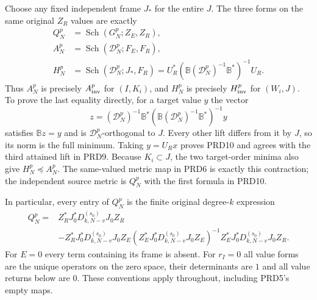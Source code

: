 \documentclass[11pt,a4paper]{article}
\begin{document}
Choose any fixed independent frame $J_*$ for the entire $J$.
The three forms on the same original $Z_R$ values are exactly
\[
\begin{aligned}
 Q_N^p&=\operatorname{Sch}(G_N^p;Z_E,Z_R),\\
 A_N^p&=\operatorname{Sch}(\mathcal D_N^p;F_E,F_R),\\
 H_N^p&=\operatorname{Sch}(\mathcal D_N^p;J_*,F_R)
      =U_R^*(\mathbb B(\mathcal D_N^p)^{-1}\mathbb B^*)^{-1}U_R.
\end{aligned}                                                    \tag{PRD10}
\]
Thus $A_N^p$ is precisely $A_{\rm inv}^p$ for $(I,K_i)$,
and $H_N^p$ is precisely $H_{\rm inv}^p$ for $(W_i,J)$.
To prove the last equality directly, for a target value $y$ the
vector
\[
 z=(\mathcal D_N^p)^{-1}\mathbb B^*
       (\mathbb B(\mathcal D_N^p)^{-1}\mathbb B^*)^{-1}y
\]
satisfies $\mathbb Bz=y$ and is $\mathcal D_N^p$-orthogonal
to $J$. Every other lift differs from it by $J$, so its norm
is the full minimum. Taking $y=U_Rx$ proves PRD10 and agrees
with the third attained lift in PRD9. Because $K_i\subset J$,
the two target-order minima also give $H_N^p\preceq A_N^p$.
The same-valued metric map in PRD6 is exactly this contraction;
the independent source metric is $Q_N^p$ with the first
formula in PRD10.

In particular, every entry of $Q_N^p$ is the finite original
degree-$k$ expression
\[
\begin{split}
 Q_N^p={}&Z_R^*J_0^*D_{k,N-v}^{(s_0)}J_0Z_R\\
 &-Z_R^*J_0^*D_{k,N-v}^{(s_0)}J_0Z_E
 (Z_E^*J_0^*D_{k,N-v}^{(s_0)}J_0Z_E)^{-1}
 Z_E^*J_0^*D_{k,N-v}^{(s_0)}J_0Z_R .
\end{split}                                                      \tag{PRD11}
\]
For $E=0$ every term containing its frame is absent. For $r_I=0$
all value forms are the unique operators on the zero space,
their determinants are $1$ and all value returns below are $0$.
These conventions apply throughout, including PRD5's empty maps.
\end{document}
